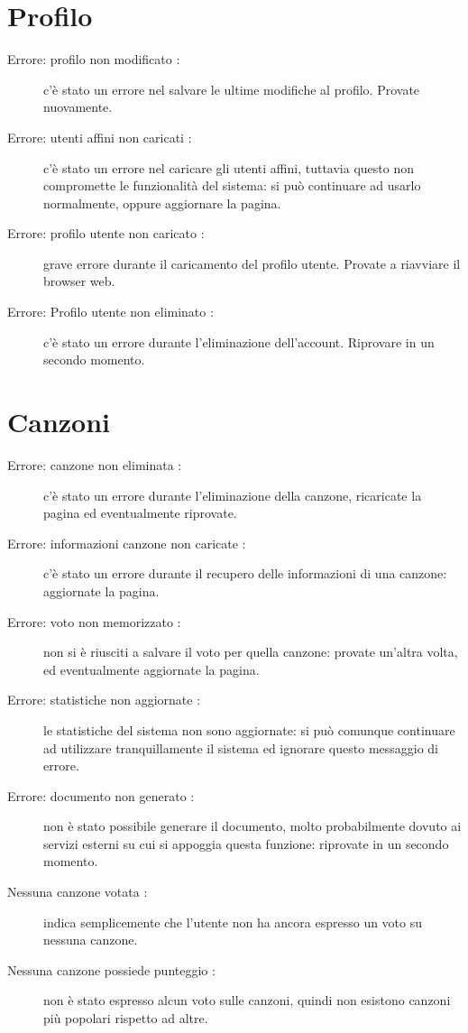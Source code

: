 \section{Profilo}
\begin{description}
	\item[Errore: profilo non modificato :] c'\`e stato un errore nel salvare le
	ultime modifiche al profilo. Provate nuovamente.
	\item[Errore: utenti affini non caricati :] c'\`e stato un errore nel caricare
	gli utenti affini, tuttavia questo non compromette le funzionalit\`a del
	sistema: si pu\`o continuare ad usarlo normalmente, oppure aggiornare la
	pagina.
	\item[Errore: profilo utente non caricato :] grave errore durante il
	caricamento del profilo utente. Provate a riavviare il browser web.
	\item[Errore: Profilo utente non eliminato :] c'\`e stato un errore durante
	l'eliminazione dell'account. Riprovare in un secondo momento.
\end{description}

\section{Canzoni}
\begin{description}
	\item[Errore: canzone non eliminata :] c'\`e stato un errore durante
	l'eliminazione della canzone, ricaricate la pagina ed eventualmente riprovate.
	\item[Errore: informazioni canzone non caricate :] c'\`e stato un errore
	durante il recupero delle informazioni di una canzone: aggiornate la pagina.
	\item[Errore: voto non memorizzato :] non si \`e riusciti a salvare il voto per
	quella canzone: provate un'altra volta, ed eventualmente aggiornate la pagina.
	\item[Errore: statistiche non aggiornate :] le statistiche del sistema non sono
	aggiornate: si pu\`o comunque continuare ad utilizzare tranquillamente il
	sistema ed ignorare questo messaggio di errore.
	\item[Errore: documento non generato :] non \`e stato possibile generare il
	documento, molto probabilmente dovuto ai servizi esterni su cui si appoggia
	questa funzione: riprovate in un secondo momento.
	\item[Nessuna canzone votata :] indica semplicemente che l'utente non ha ancora
	espresso un voto su nessuna canzone.
	\item[Nessuna canzone possiede punteggio :] non \`e stato espresso alcun
	voto sulle canzoni, quindi non esistono canzoni pi\`u popolari rispetto ad
	altre.
\end{description}

